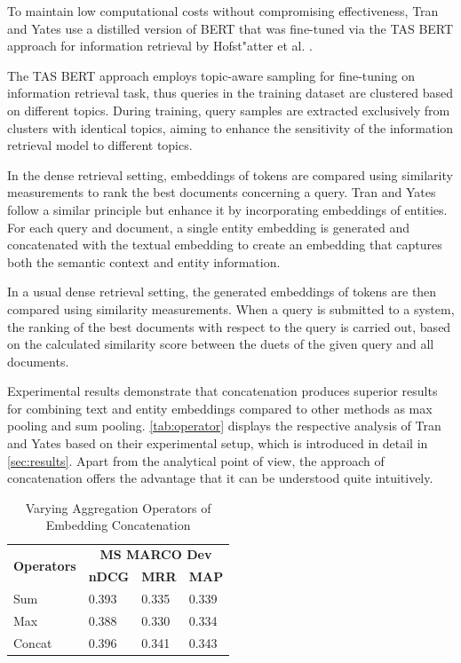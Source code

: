 To maintain low computational costs without compromising effectiveness, Tran and Yates use a distilled version of BERT that was fine-tuned via the TAS BERT approach for information retrieval by Hofst{"a}tter et al. \cite{tasbert}.

The TAS BERT approach employs topic-aware sampling for fine-tuning on information retrieval task, thus queries in the training dataset are clustered based on different topics. During training, query samples are extracted exclusively from clusters with identical topics, aiming to enhance the sensitivity of the information retrieval model to different topics.

In the dense retrieval setting, embeddings of tokens are compared using similarity measurements to rank the best documents concerning a query. Tran and Yates follow a similar principle but enhance it by incorporating embeddings of entities. For each query and document, a single entity embedding is generated and concatenated with the textual embedding to create an embedding that captures both the semantic context and entity information.

In a usual dense retrieval setting, the generated embeddings of tokens are then compared using similarity measurements. When a query is submitted to a system, the ranking of the best documents with respect to the query is carried out, based on the calculated similarity score between the duets of the given query and all documents. 

Experimental results demonstrate that concatenation produces superior results for combining text and entity embeddings compared to other methods as max pooling and sum pooling. \autoref{tab:operator} displays the respective analysis of Tran and Yates based on their experimental setup, which is introduced in detail in \autoref{sec:results}. Apart from the analytical point of view, the approach of concatenation offers the advantage that it can be understood quite intuitively.

\begin{table}[!htb]
    \centering
    \begin{tabular}{llll}
    \hline
    \multirow{2}{*}{\textbf{Operators}} & \multicolumn{3}{c}{\textbf{MS MARCO Dev}}   \\
                                      & \textbf{nDCG} & \textbf{MRR} & \textbf{MAP} \\
    \hline
    Sum & 0.393 & 0.335 & 0.339 \\
    Max & 0.388 & 0.330 & 0.334 \\
    Concat & 0.396 & 0.341 & 0.343 \\
    \hline
    \end{tabular}
    \caption{Varying Aggregation Operators of Embedding Concatenation}
    \label{tab:operator}
\end{table}

